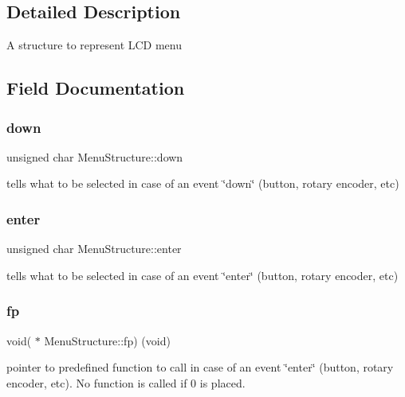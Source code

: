 \subsection{Detailed Description}
A structure to represent L\+CD menu 

\subsection{Field Documentation}
\mbox{\label{struct_menu_structure_a91c52cae9cca9734fd5b116d9624db08}} 
\subsubsection{\texorpdfstring{down}{down}}
{\footnotesize\ttfamily unsigned char Menu\+Structure\+::down}

tells what to be selected in case of an event \char`\"{}down\char`\"{} (button, rotary encoder, etc) \mbox{\label{struct_menu_structure_a18371001fe83f38e112c2cdb237fe821}} 
\subsubsection{\texorpdfstring{enter}{enter}}
{\footnotesize\ttfamily unsigned char Menu\+Structure\+::enter}

tells what to be selected in case of an event \char`\"{}enter\char`\"{} (button, rotary encoder, etc) \mbox{\label{struct_menu_structure_a9fa7771424c33bfa30bf05f7fdcc4a1a}} 
\subsubsection{\texorpdfstring{fp}{fp}}
{\footnotesize\ttfamily void( $\ast$ Menu\+Structure\+::fp) (void)}

pointer to predefined function to call in case of an event \char`\"{}enter\char`\"{} (button, rotary encoder, etc). No function is called if 0 is placed. \mbox{\label{struct_menu_structure_a03bb2b81933329456adb5a4dd4e6ee68}} 
